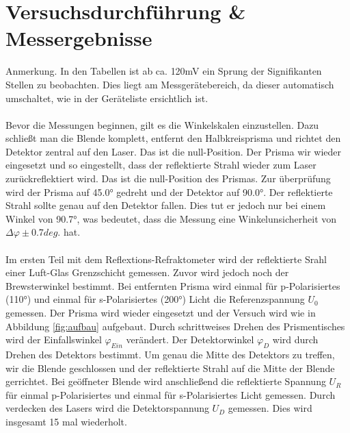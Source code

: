 \documentclass[12pt,a4paper,twoside]{article}
\begin{document}
\section{Versuchsdurchführung \& Messergebnisse} %
Anmerkung. In den Tabellen ist ab ca. 120mV ein Sprung der Signifikanten Stellen zu beobachten. Dies liegt am Messgerätebereich, da dieser automatisch umschaltet, wie in der Geräteliste ersichtlich ist. 
\\
\\
Bevor die Messungen beginnen, gilt es die Winkelskalen einzustellen. Dazu schließt man die Blende komplett, entfernt den Halbkreisprisma und richtet den Detektor zentral auf den Laser. 
Das ist die null-Position. Der Prisma wir wieder eingesetzt und so eingestellt, dass der reflektierte Strahl wieder zum Laser zurückreflektiert wird. Das ist die null-Position des Prismas. 
Zur überprüfung wird der Prisma auf 45.0° gedreht und der Detektor auf 90.0°. Der reflektierte Strahl sollte genau auf den Detektor fallen. 
Dies tut er jedoch nur bei einem Winkel von 90.7°, was bedeutet, dass die Messung eine Winkelunsicherheit von $\Delta \varphi \pm 0.7 deg. $ hat. 
\\
\\
Im ersten Teil mit dem Reflextions-Refraktometer wird der reflektierte Srahl einer Luft-Glas Grenzschicht gemessen. 
Zuvor wird jedoch noch der Brewsterwinkel bestimmt. Bei entfernten Prisma wird einmal für p-Polarisiertes (110°) und einmal für s-Polarisiertes (200°) Licht die Referenzspannung $U_0$ gemessen. 
Der Prisma wird wieder eingesetzt und der Versuch wird wie in Abbildung \ref{fig:aufbau} aufgebaut. Durch schrittweises Drehen des Prismentisches wird der Einfallswinkel $\varphi_{Ein}$ verändert. Der Detektorwinkel $\varphi_D$ wird durch Drehen des Detektors bestimmt. Um genau die Mitte des Detektors zu treffen, 
wir die Blende geschlossen und der reflektierte Strahl auf die Mitte der Blende gerrichtet. Bei geöffneter Blende wird anschließend die reflektierte Spannung $U_R$ für einmal p-Polarisiertes und einmal für s-Polarisiertes Licht gemessen. 
Durch verdecken des Lasers wird die Detektorspannung $U_D$ gemessen. Dies wird insgesamt 15 mal wiederholt. 
\end{document}
